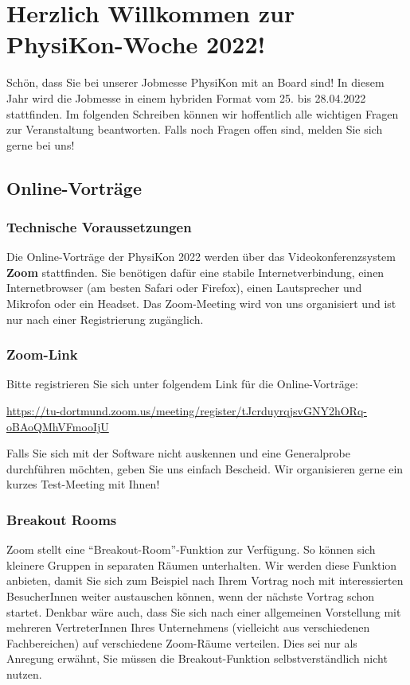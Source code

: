 \documentclass[
  paper=a4,
  fontsize=12pt,
  DIV=16,
  headheight=30pt,
  footheight=45pt,
  headinclude,
  parskip=half,
]{scrartcl}
\begin{document}
\section*{Herzlich Willkommen zur PhysiKon-Woche 2022!}

Schön, dass Sie bei unserer Jobmesse PhysiKon mit an Board sind!
In diesem Jahr wird die Jobmesse in einem hybriden Format vom 25. bis 28.04.2022 stattfinden.
Im folgenden Schreiben können wir hoffentlich alle wichtigen Fragen zur Veranstaltung beantworten.
Falls noch Fragen offen sind, melden Sie sich gerne bei uns!

\subsection*{Online-Vorträge}
\subsubsection*{Technische Voraussetzungen}

Die Online-Vorträge der PhysiKon 2022 werden über das Videokonferenzsystem \textbf{Zoom} stattfinden.
Sie benötigen dafür eine stabile Internetverbindung, einen Internetbrowser (am besten Safari oder Firefox), einen Lautsprecher und Mikrofon oder ein Headset.
Das Zoom-Meeting wird von uns organisiert und ist nur nach einer Registrierung zugänglich.

\subsubsection*{Zoom-Link}
Bitte registrieren Sie sich unter folgendem Link für die Online-Vorträge:

\url{https://tu-dortmund.zoom.us/meeting/register/tJcrduyrqjsvGNY2hORq-oBAoQMhVFmooIjU}

Falls Sie sich mit der Software nicht auskennen und eine Generalprobe durchführen möchten, geben Sie uns einfach Bescheid.
Wir organisieren gerne ein kurzes Test-Meeting mit Ihnen!

\subsubsection*{Breakout Rooms}
Zoom stellt eine \enquote{Breakout-Room}-Funktion zur Verfügung.
So können sich kleinere Gruppen in separaten Räumen unterhalten.
Wir werden diese Funktion anbieten, damit Sie sich zum Beispiel nach Ihrem Vortrag noch mit interessierten BesucherInnen weiter austauschen können, wenn der nächste Vortrag schon startet.
Denkbar wäre auch, dass Sie sich nach einer allgemeinen Vorstellung mit mehreren VertreterInnen Ihres Unternehmens (vielleicht aus verschiedenen Fachbereichen) auf verschiedene Zoom-Räume verteilen.
Dies sei nur als Anregung erwähnt, Sie müssen die Breakout-Funktion selbstverständlich nicht nutzen.
\end{document}

